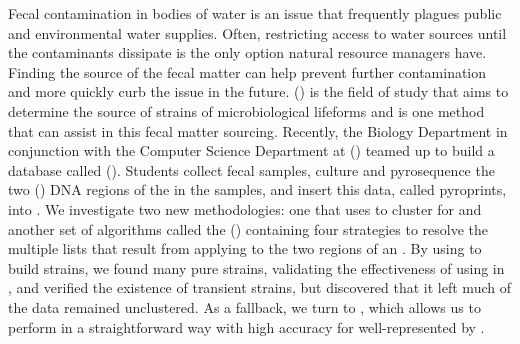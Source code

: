 Fecal contamination in bodies of water is an issue that frequently plagues public and environmental water supplies.
Often, restricting access to water sources until the contaminants dissipate is the only option natural resource managers have.
Finding the source of the fecal matter can help prevent further contamination and more quickly curb the issue in the future.
\MSTlong{} (\mst{}) is the field of study that aims to determine the source \spec{} of strains of microbiological lifeforms and \libdep{} \mst{} is one method that can assist in this fecal matter sourcing.
Recently, the Biology Department in conjunction with the Computer Science Department at \cplong{} (\cp{}) teamed up to build a database called \cploplong{} (\cplop{}).
Students collect fecal samples, culture \isols{} and pyrosequence the two \itslong{} (\itsshort{}) DNA regions of the \ecoli{} in the samples, and insert this data, called pyroprints, into \cplop{}.
We investigate two new \mst{} methodologies: one that uses \dbscan{} to cluster for \bslongs{} and another set of algorithms called the \kraplong{} (\krap{}) containing four strategies to resolve the multiple \knnlong{} lists that result from applying \knnlong{} to the two \itsshort{} regions of an \ecoli{} \isol{}.
By using \dbscan{} to build strains, we found many pure strains, validating the effectiveness of using \ecoli{} in \cplop{}, and verified the existence of transient strains, but discovered that it left much of the data remained unclustered.
As a fallback, we turn to \krap{}, which allows us to perform \mst{} in a straightforward way with high accuracy for \spec{} well-represented by \cplop{}.